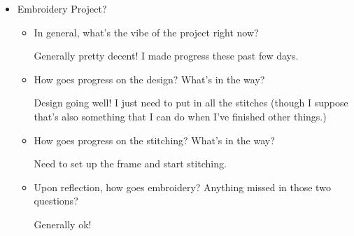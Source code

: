 \documentclass[12pt]{article}
\renewcommand{\,}{\textsuperscript{,}}
\begin{document}
\begin{itemize}
\begin{itemize}
\begin{itemize}
\item How goes playing?

Eh, did some guitar yesterday. Otherwise, some guitar, some singing on Wednesday.

\item How goes listening?

Good! Listened through this past week's album club a few times.  
I pick this week's album, so picked an album from a folk group I recently discovered.  
It's really interesting; they have what is effectively an inverse karaoke version of their album, where they remove all the instruments and it's just their vocals.  
I'm enjoying it so far.

\item How goes digital music creation?

...

\item Upon reflection, how goes music? Anything missed in those five questions?

Generally ok! I think that hits most all of what I want to talk about right now.

\end{itemize}  

 \item Embroidery Project?  
 \begin{itemize}

 \item In general, what's the vibe of the project right now?

Generally pretty decent! I made progress these past few days.

\item How goes progress on the design? What's in the way?

Design going well! I just need to put in all the stitches (though I suppose that's also something that I can do when I've finished other things.)

\item How goes progress on the stitching? What's in the way?

Need to set up the frame and start stitching.  
   
 \item Upon reflection, how goes embroidery? Anything missed in those two questions?

Generally ok!  
   

\end{itemize}
\end{itemize}
\end{itemize}
\end{document}
